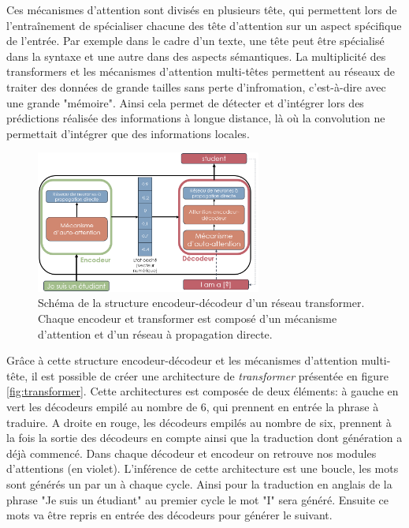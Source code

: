 Ces mécanismes d'attention sont divisés en plusieurs tête, qui permettent lors de l'entraînement de spécialiser chacune des tête d'attention sur un aspect spécifique de l'entrée. Par exemple dans le cadre d'un texte, une tête peut être spécialisé dans la syntaxe et une autre dans des aspects sémantiques. 
La multiplicité des transformers et les mécanismes d'attention multi-têtes permettent au réseaux de traiter des données de grande tailles sans perte d'infromation, c'est-à-dire avec une grande "mémoire". Ainsi cela permet de détecter et d'intégrer lors des prédictions réalisée des informations à longue distance, là où la convolution ne permettait d'intégrer que des informations locales.
\begin{figure}[!htbp]
 \centering
 \includegraphics[width=0.66\textwidth]{figures/encoder_attention.png}
 \caption[Schéma de la structure encodeur-décodeur d'un réseau transformer]{Schéma de la structure encodeur-décodeur d'un réseau transformer. Chaque encodeur et transformer est composé d'un mécanisme d'attention et d'un réseau à propagation directe.}
 \label{fig:encoder_attention}
\end{figure}
Grâce à cette structure encodeur-décodeur et les mécanismes d'attention multi-tête, il est possible de créer une architecture de \textit{transformer} présentée en figure \ref{fig:transformer}. Cette architectures est composée de deux éléments: à gauche en vert les décodeurs empilé au nombre de 6, qui prennent en entrée la phrase à traduire. A droite en rouge, les décodeurs empilés au nombre de six, prennent à la fois la sortie des décodeurs en compte ainsi que la traduction dont génération a déjà commencé. Dans chaque décodeur et encodeur on retrouve nos modules d'attentions (en violet). L'inférence de cette architecture est une boucle, les mots sont générés un par un à chaque cycle. Ainsi pour la traduction en anglais de la phrase "Je suis un étudiant" au premier cycle le mot "I" sera généré. Ensuite ce mots va être repris en entrée des décodeurs pour générer le suivant.
